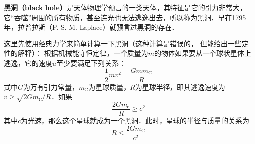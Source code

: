 

\textbf{黑洞（black hole）}是天体物理学预言的一类天体，其特征是它的引力非常大，它“吞噬”周围的所有物质，甚至连光也无法逃逸出去，所以称为黑洞．早在1795 年，拉普拉斯（P. S. M. Laplace）就预言过黑洞的存在．

这里先使用经典力学来简单计算一下黑洞（这种计算是错误的， 但能给出一些定性的解释）： 根据机械能守恒定律，一个质量为$m$的物体如果要从一个球状星体上逃逸，它的速度$u $至少要满足下列关系：
\begin{equation}
\frac{1}{2} m v^{2}=\frac{G m m_{\mathrm{C}}}{R}
\end{equation}
式中$G $为万有引力常量，$ m_{\mathrm{C}}$为星球质量，$ R $为星球半径，即其逃逸速度为$v \geqslant \sqrt{2 G m_{\mathrm{C}}/R}$．如果
\begin{equation}
\frac{2 G m_{\mathrm{c}}}{R} \geqslant c^{2}
\end{equation}
其中$c$为光速，那么这个星球就成为一个黑洞．此时，星球的半径与质量的关系为
\begin{equation}
R \leqslant \frac{2 G m_{\mathrm{C}}}{c^{2}}
\end{equation}